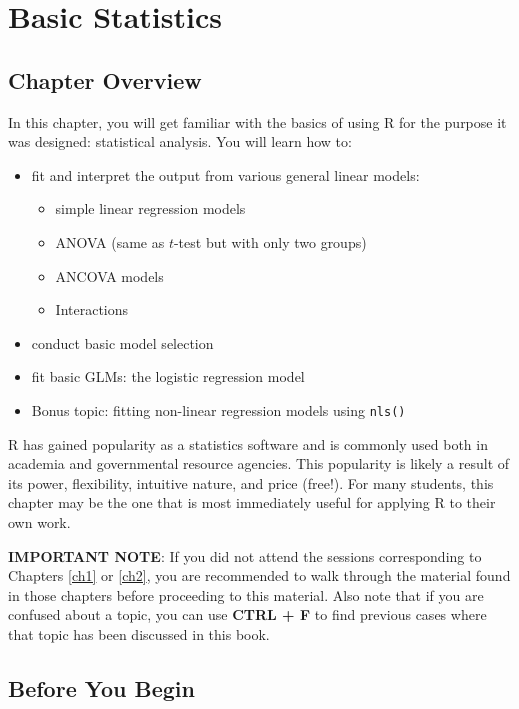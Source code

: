 \documentclass[]{book}
\providecommand{\tightlist}{%
  \setlength{\itemsep}{0pt}\setlength{\parskip}{0pt}}
\theoremstyle{definition}
\theoremstyle{definition}
\theoremstyle{definition}
\theoremstyle{remark}
\begin{document}
\chapter{Basic Statistics}\label{ch3}

\section*{Chapter Overview}\label{chapter-overview-2}

In this chapter, you will get familiar with the basics of using R for
the purpose it was designed: statistical analysis. You will learn how
to:

\begin{itemize}
\tightlist
\item
  fit and interpret the output from various general linear models:

  \begin{itemize}
  \tightlist
  \item
    simple linear regression models
  \item
    ANOVA (same as \(t\)-test but with only two groups)
  \item
    ANCOVA models
  \item
    Interactions
  \end{itemize}
\item
  conduct basic model selection
\item
  fit basic GLMs: the logistic regression model
\item
  Bonus topic: fitting non-linear regression models using \texttt{nls()}
\end{itemize}

R has gained popularity as a statistics software and is commonly used
both in academia and governmental resource agencies. This popularity is
likely a result of its power, flexibility, intuitive nature, and price
(free!). For many students, this chapter may be the one that is most
immediately useful for applying R to their own work.

\textbf{IMPORTANT NOTE}: If you did not attend the sessions
corresponding to Chapters \ref{ch1} or \ref{ch2}, you are recommended to
walk through the material found in those chapters before proceeding to
this material. Also note that if you are confused about a topic, you can
use \textbf{CTRL + F} to find previous cases where that topic has been
discussed in this book.

\section*{Before You Begin}\label{before-you-begin-2}
\end{document}

